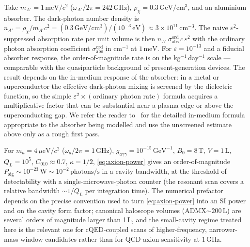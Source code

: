 \begin{example}
\label{ex:dark-photon-rate}
Take $m_{A'}=1\,\text{meV}/c^2$ ($\omega_{A'}/2\pi=242\,\text{GHz}$),
$\rho_\chi=0.3\,\text{GeV}/\text{cm}^3$, and an aluminium
absorber. The dark-photon number density is
$n_{A'}=\rho_\chi/m_{A'}c^2=(0.3\,\text{GeV}/\text{cm}^3)/(10^{-3}\,\text{eV})
\approx 3\times 10^{11}\,\text{cm}^{-3}$. The naive
$\varepsilon^2$-suppressed absorption rate per unit volume is then
$n_{A'}\,\sigma_\text{abs}^\text{ord}\,c\,\varepsilon^2$ with the
ordinary photon absorption coefficient
$\sigma_\text{abs}^\text{ord}$ in $\text{cm}^{-1}$ at $1\,\text{meV}$.
For $\varepsilon=10^{-13}$ and a fiducial absorber response, the
order-of-magnitude rate is on the kg$^{-1}$\,day$^{-1}$ scale ---
comparable with the quasiparticle background of present-generation
devices. The result depends on the in-medium response of the
absorber: in a metal or superconductor the effective dark-photon
mixing is screened by the dielectric function, so the simple
$\varepsilon^2 \times (\text{ordinary photon rate})$ formula
acquires a multiplicative factor that can be substantial near a
plasma edge or above the superconducting gap. We refer the reader
to~\cite{caputo2021review} for the detailed in-medium formula
appropriate to the absorber being modelled and use the
unscreened estimate above only as a rough first pass.
\end{example}

\begin{example}
\label{ex:axion-power}
For $m_a=4\,\mu\text{eV}/c^2$ ($\omega_a/2\pi=1\,\text{GHz}$),
$g_{a\gamma\gamma}=10^{-15}\,\text{GeV}^{-1}$,
$B_0=8\,\text{T}$, $V=1\,\text{L}$, $Q_L=10^5$, $C_{010}\approx 0.7$,
$\kappa=1/2$, \cref{eq:axion-power} gives an order-of-magnitude
$P_\text{sig}\sim 10^{-23}\,\text{W}\sim 10^{-2}\,\text{photons}/\text{s}$
in a cavity bandwidth, at the threshold of detectability with a
single-microwave-photon counter (the resonant scan covers a
relative bandwidth $\sim 1/Q_L$ per integration time). The
numerical prefactor depends on the precise convention used to
turn \cref{eq:axion-power} into an SI power and on the cavity
form factor; canonical haloscope volumes
(ADMX$\sim 200\,\text{L}$) are several orders of magnitude
larger than 1\,L, and the small-cavity regime treated here is the
relevant one for cQED-coupled scans of higher-frequency,
narrower-mass-window candidates rather than for QCD-axion
sensitivity at $1\,\text{GHz}$.
\end{example}


